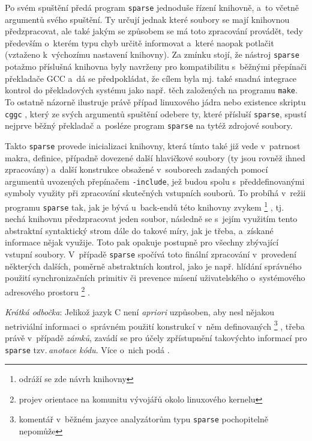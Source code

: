 Po svém spuštění předá program \texttt{sparse} jednoduše řízení knihovně, a~to
včetně argumentů svého spuštění. Ty určují jednak které soubory se mají knihovnou
předzpracovat, ale také jakým se způsobem se má toto zpracování provádět, tedy
především o~kterém typu chyb určitě informovat a~které naopak potlačit
(vztaženo k~výchozímu nastavení knihovny). Za zmínku
stojí, že nástroj \texttt{sparse} potažmo příslušná knihovna byly navrženy pro
kompatibilitu s~běžnými přepínači překladače GCC a~dá se předpokládat,
že cílem byla mj. také snadná integrace kontrol do překladových systému jako
např. těch založených na programu \texttt{make}. To ostatně názorně ilustruje
právě případ linuxového jádra \cite{web:MjmWired:SparseTxt} nebo existence
skriptu \texttt{cggc} \cite{manual:cgcc}, který ze svých argumentů spuštění odebere ty,
které přísluší \texttt{sparse}, spustí nejprve běžný překladač a~posléze
program \texttt{sparse} na tytéž zdrojové soubory.

Takto \texttt{sparse} provede inicializaci knihovny, která tímto také již vede
v~patrnost makra, definice, případně dovezené další hlavičkové soubory (ty jsou
rovněž ihned zpracovány) a~další konstrukce obsažené v~souborech zadaných pomocí
argumentů uvozených přepínačem \texttt{-include}, jež budou spolu s~předdefinovanými
symboly využity při zpracování skutečných vstupních souborů.
To probíhá v~režii programu \texttt{sparse} tak, jak je bývá u~back-endů
této knihovny zvykem%
%
\footnote{odráží se zde návrh knihovny}%
%
, tj. nechá knihovnu předzpracovat jeden soubor,
následně se s~jejím využitím tento abstraktní syntaktický strom dále 
do takové míry, jak je třeba, a~získané informace nějak využije.
Toto pak opakuje postupně pro všechny zbývající vstupní soubory.
V~případě \texttt{sparse} spočívá toto finální zpracování v~provedení některých dalších,
poměrně abstraktních kontrol, jako je např. hlídání správného použití
synchronizačních primitiv či prevence mísení uživatelského
o~systémového adresového prostoru%
%
\footnote{projev orientace na komunitu vývojářů okolo linuxového
kernelu}%
%
.

\noindent
\emph{Krátká odbočka}: Jelikož jazyk C není \textit{apriori} uzpůsoben, aby nesl nějakou
netriviální informaci o~správném použití konstrukcí v~něm definovaných%
%
\footnote{komentář v~běžném jazyce analyzátorům typu \texttt{sparse} pochopitelně
nepomůže}%
%
, třeba právě v~případě \emph{zámků}, zavádí se pro účely zpřístupnění
takovýchto informací pro \texttt{sparse} tzv.\,\emph{anotace kódu}. Více o~nich
podá \cite{web:FITVUTBR:MartinNagy:StaticAnalysis}.

